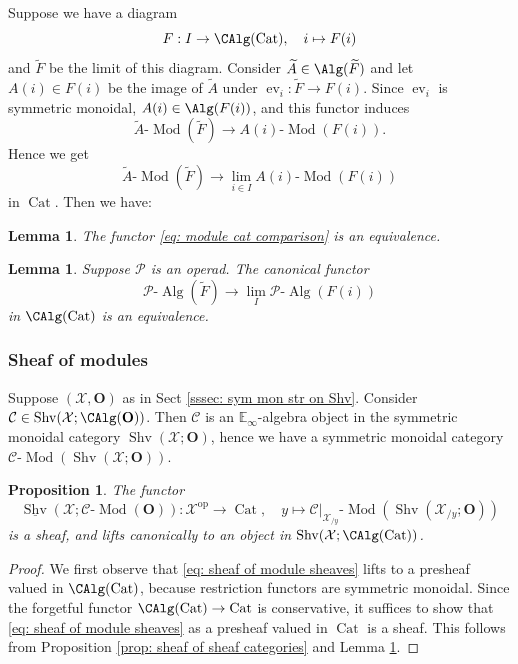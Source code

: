 \documentclass[10pt]{amsart}
\newcommand{\sssec}{\subsubsection}
\newtheorem{lemma}[subsubsection]{Lemma}
\newtheorem{prop}[subsubsection]{Proposition}
\theoremstyle{remark}
\newcommand{\ul}{\underline}
\newcommand{\wt}{\widetilde}
\newcommand{\E}{\mathbb{E}}
\newcommand{\cP}{\mathcal{P}}
\newcommand{\on}{\operatorname}
\newcommand{\cC}{\mathcal{C}}
\newcommand{\cX}{\mathcal{X}}
\newcommand{\Cat}{\on{Cat}}
\newcommand{\lMod}{\text{-}\on{Mod}}
\newcommand{\lAlg}{\text{-}\on{Alg}}
\newcommand{\Shv}{\on{Shv}}
\newcommand{\bO}{\mathbf{O}}
\begin{document}
\sssec{}
Suppose we have a diagram
    \[F:I\rightarrow\CAlg(\Cat),\quad i\mapsto F(i)\]
    and $\wt{F}$ be the limit of this diagram. Consider $\wt{A}\in\Alg(\wt{F})$ and let $A(i)\in F(i)$ be the image of $\wt{A}$ under $\on{ev}_i:\wt{F}\rightarrow F(i)$. Since $\on{ev}_i$ is symmetric monoidal, $A(i)\in\Alg(F(i))$, and this functor induces
    \[\wt{A}\lMod(\wt{F})\rightarrow A(i)\lMod(F(i)).\]
    Hence we get
    \begin{equation}\label{eq: module cat comparison}
        \wt{A}\lMod(\wt{F})\rightarrow \lim_{i\in I}A(i)\lMod(F(i))
    \end{equation}
    in $\Cat$. Then we have:
    
\begin{lemma}\label{lem: module category limit}
    The functor \eqref{eq: module cat comparison} is an equivalence.
\end{lemma}

\begin{lemma}\label{lem: limit and algebra objects}
Suppose $\cP$ is an operad.
    The canonical functor
    \[\cP\lAlg(\wt{F})\rightarrow\lim_{I}\cP\lAlg(F(i))\]
    in $\CAlg(\Cat)$ is an equivalence.
\end{lemma}



\sssec{Sheaf of modules}\label{sssec: setup sheaf of modules}
Suppose $(\cX,\bO)$ as in Sect \ref{sssec: sym mon str on Shv}. Consider $\cC\in \Shv(\cX;\CAlg(\bO))$. Then $\cC$ is an $\E_{\infty}$-algebra object in the symmetric monoidal category $\Shv(\cX;\bO)$, hence we have a symmetric monoidal category
$\cC\lMod(\Shv(\cX;\bO))$.


\begin{prop}\label{prop: sheaf of module categories}
    The functor
    \begin{equation}\label{eq: sheaf of module sheaves}
        \ul{\Shv}(\cX;\cC\lMod(\bO)):\cX^{\on{op}}\rightarrow \Cat,\quad y\mapsto \cC|_{\cX_{/y}}\lMod\left(\Shv(\cX_{/y};\bO)\right)
    \end{equation}
    is a sheaf, and lifts canonically to an object in $\Shv(\cX;\CAlg(\Cat))$.
\end{prop}
\begin{proof}
    We first observe that \eqref{eq: sheaf of module sheaves}
    lifts to a presheaf valued in $\CAlg(\Cat)$, because restriction functors are symmetric monoidal. Since the forgetful functor $\CAlg(\Cat)\rightarrow \Cat$ is conservative, it suffices to show that \eqref{eq: sheaf of module sheaves}
    as a presheaf valued in $\Cat$ is a sheaf.
    This follows from Proposition \ref{prop: sheaf of sheaf categories} and Lemma \ref{lem: module category limit}.
\end{proof}
\end{document}
